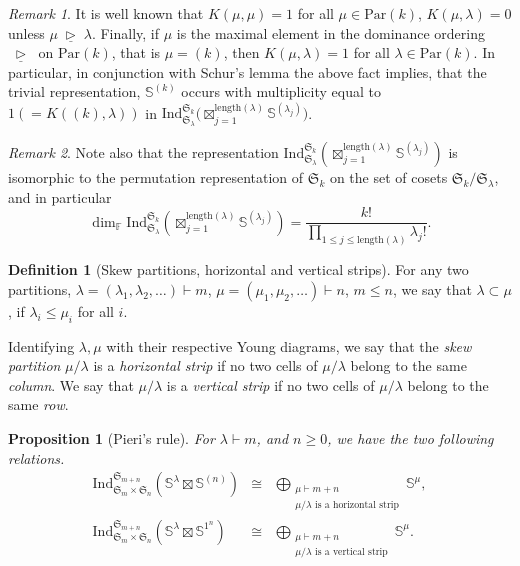 \documentclass{amsart}
\newtheorem{proposition}{Proposition}
\theoremstyle{definition}
\newtheorem{definition}{Definition}
\theoremstyle{remark}
\newtheorem{remark}{Remark}
\numberwithin{equation}{section}
\begin{document}
\begin{remark}
It is well known that
$K(\mu,\mu) = 1$ for all $\mu \in {\mathrm{Par}}(k)$, $K(\mu,\lambda)= 0$ unless $\mu {{\;\underline{\triangleright}\;}} \lambda$. Finally, if $\mu$ is the maximal element in the dominance ordering ${{\;\underline{\triangleright}\;}}$ on ${\mathrm{Par}}(k)$, that is $\mu = (k)$, then $K(\mu,\lambda) = 1$ for all $\lambda \in {\mathrm{Par}}(k)$.
In particular, in conjunction with Schur's lemma the above fact implies, that the trivial representation, $\mathbb{S}^{(k)}$ occurs with multiplicity equal to $1 (= K((k),\lambda))$ in ${\mathrm{Ind}}_{\mathfrak{S}_\lambda}^{\mathfrak{S}_k}\big(\boxtimes_{j=1}^{{\mathrm{length}}(\lambda)}\mathbb{S}^{(\lambda_j)}\big)$.
\end{remark}

\begin{remark}
Note also that the representation
${\mathrm{Ind}}_{\mathfrak{S}_\lambda}^{\mathfrak{S}_k}(\boxtimes_{j=1}^{{\mathrm{length}}(\lambda)} \mathbb{S}^{(\lambda_j)})$
is isomorphic to the permutation representation
of $\mathfrak{S}_k$ on the set of cosets $\mathfrak{S}_k/\mathfrak{S}_\lambda$, and in particular
\[
\dim_{\mathbb{F}} {\mathrm{Ind}}_{\mathfrak{S}_\lambda}^{\mathfrak{S}_k}(\boxtimes_{j=1}^{{\mathrm{length}}(\lambda)} \mathbb{S}^{(\lambda_j)})
=
\frac{k!}{\prod_{1\leq j \leq {\mathrm{length}}(\lambda)} \lambda_j!}.
\]
\end{remark}

\begin{definition}[Skew partitions, horizontal and vertical strips]
\label{def:skew-partition-strips}
For any two partitions, $\lambda=(\lambda_1,\lambda_2,\ldots) \vdash m$, $\mu=(\mu_1,\mu_2,\ldots) \vdash n$, $m \leq n$,  we say that $\lambda \subset \mu$,
if $\lambda_i \leq \mu_i$ for all $i$.

Identifying $\lambda,\mu$ with their respective Young diagrams,
we say that the \emph{skew partition} $\mu/\lambda$ is a \emph{horizontal strip} if no two cells
of $\mu/\lambda$ belong to the same \emph{column}. 
We say that $\mu/\lambda$ is a \emph{vertical strip}
if no two cells of $\mu/\lambda$ belong to the same \emph{row}.
\end{definition}

\begin{proposition}[Pieri's rule]
\label{prop:Pieri}
For $\lambda \vdash m$, and $n \geq 0$, we have the two following relations.
\begin{eqnarray*}
{\mathrm{Ind}}_{\mathfrak{S}_m \times \mathfrak{S}_n}^{\mathfrak{S}_{m+n}} (\mathbb{S}^\lambda \boxtimes \mathbb{S}^{(n)}) 
&\cong& \bigoplus_{\substack{\mu \vdash m+n \\ \mu/\lambda \mbox{ is a horizontal strip}}} \mathbb{S}^\mu, \\
{\mathrm{Ind}}_{\mathfrak{S}_m \times \mathfrak{S}_n}^{\mathfrak{S}_{m+n}} (\mathbb{S}^\lambda \boxtimes \mathbb{S}^{1^n}) 
&\cong& \bigoplus_{\substack{\mu \vdash m+n \\ \mu/\lambda \mbox{ is a vertical strip}}} \mathbb{S}^\mu.
\end{eqnarray*}
\end{proposition}
\end{document}

